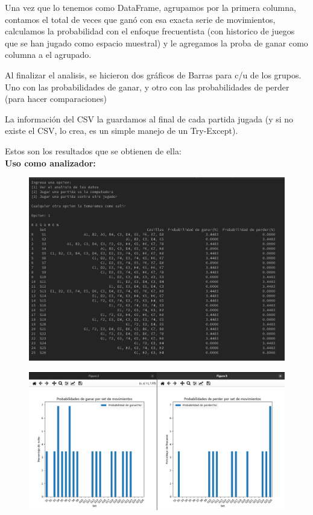 \documentclass[12pt, Tahoma]{article}
\begin{document}
	Una vez que lo tenemos como DataFrame, agrupamos por la primera columna, contamos el total de veces que ganó con esa exacta serie de movimientos, calculamos la probabilidad con el enfoque frecuentista (con historico de juegos que se han jugado como espacio muestral) y le agregamos la proba de ganar como columna a el agrupado.


	Al finalizar el analisis, se hicieron dos gráficos de Barras para c/u de los grupos. Uno con las probabilidades de ganar, y otro con las probabilidades de perder (para hacer comparaciones) 


	La información del CSV la guardamos al final de cada partida jugada (y si no existe el CSV, lo crea, es un simple manejo de un Try-Except).  
	
	
	Estos son los resultados que se obtienen de ella: \\
	\textbf{Uso como analizador: }
	\begin{figure}[H]
		\centering
		\includegraphics[scale=0.4]{Resultados1.png}
	\end{figure}
	\begin{figure}[H]
		\centering
		\includegraphics[scale=0.35]{Resultados2.png}
	\end{figure}
	
\end{document}
